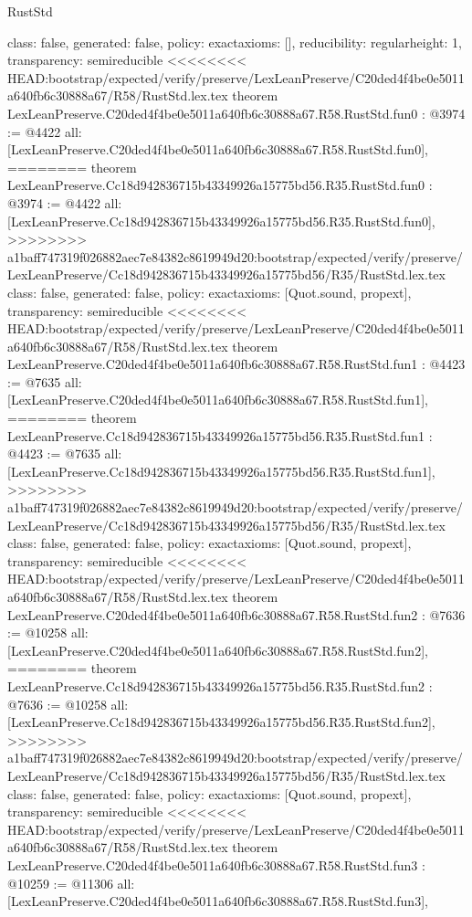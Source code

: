 \begin{lexlean}{RustStd}
\begin{coremodule}
{\begin{coremodule}
{{{  class: false,
  generated: false,
  policy: exact{axioms: []},
  reducibility: regular{height: 1},
  transparency: semireducible
}
<<<<<<<< HEAD:bootstrap/expected/verify/preserve/LexLeanPreserve/C20ded4f4be0e5011a640fb6c30888a67/R58/RustStd.lex.tex
theorem LexLeanPreserve.C20ded4f4be0e5011a640fb6c30888a67.R58.RustStd.fun0 : @3974 := @4422 {
  all: [LexLeanPreserve.C20ded4f4be0e5011a640fb6c30888a67.R58.RustStd.fun0],
========
theorem LexLeanPreserve.Cc18d942836715b43349926a15775bd56.R35.RustStd.fun0 : @3974 := @4422 {
  all: [LexLeanPreserve.Cc18d942836715b43349926a15775bd56.R35.RustStd.fun0],
>>>>>>>> a1baff747319f026882aec7e84382c8619949d20:bootstrap/expected/verify/preserve/LexLeanPreserve/Cc18d942836715b43349926a15775bd56/R35/RustStd.lex.tex
  class: false,
  generated: false,
  policy: exact{axioms: [Quot.sound, propext]},
  transparency: semireducible
}
<<<<<<<< HEAD:bootstrap/expected/verify/preserve/LexLeanPreserve/C20ded4f4be0e5011a640fb6c30888a67/R58/RustStd.lex.tex
theorem LexLeanPreserve.C20ded4f4be0e5011a640fb6c30888a67.R58.RustStd.fun1 : @4423 := @7635 {
  all: [LexLeanPreserve.C20ded4f4be0e5011a640fb6c30888a67.R58.RustStd.fun1],
========
theorem LexLeanPreserve.Cc18d942836715b43349926a15775bd56.R35.RustStd.fun1 : @4423 := @7635 {
  all: [LexLeanPreserve.Cc18d942836715b43349926a15775bd56.R35.RustStd.fun1],
>>>>>>>> a1baff747319f026882aec7e84382c8619949d20:bootstrap/expected/verify/preserve/LexLeanPreserve/Cc18d942836715b43349926a15775bd56/R35/RustStd.lex.tex
  class: false,
  generated: false,
  policy: exact{axioms: [Quot.sound, propext]},
  transparency: semireducible
}
<<<<<<<< HEAD:bootstrap/expected/verify/preserve/LexLeanPreserve/C20ded4f4be0e5011a640fb6c30888a67/R58/RustStd.lex.tex
theorem LexLeanPreserve.C20ded4f4be0e5011a640fb6c30888a67.R58.RustStd.fun2 : @7636 := @10258 {
  all: [LexLeanPreserve.C20ded4f4be0e5011a640fb6c30888a67.R58.RustStd.fun2],
========
theorem LexLeanPreserve.Cc18d942836715b43349926a15775bd56.R35.RustStd.fun2 : @7636 := @10258 {
  all: [LexLeanPreserve.Cc18d942836715b43349926a15775bd56.R35.RustStd.fun2],
>>>>>>>> a1baff747319f026882aec7e84382c8619949d20:bootstrap/expected/verify/preserve/LexLeanPreserve/Cc18d942836715b43349926a15775bd56/R35/RustStd.lex.tex
  class: false,
  generated: false,
  policy: exact{axioms: [Quot.sound, propext]},
  transparency: semireducible
}
<<<<<<<< HEAD:bootstrap/expected/verify/preserve/LexLeanPreserve/C20ded4f4be0e5011a640fb6c30888a67/R58/RustStd.lex.tex
theorem LexLeanPreserve.C20ded4f4be0e5011a640fb6c30888a67.R58.RustStd.fun3 : @10259 := @11306 {
  all: [LexLeanPreserve.C20ded4f4be0e5011a640fb6c30888a67.R58.RustStd.fun3],
}}}}}}
\end{coremodule}}
\end{coremodule}
\end{lexlean}
